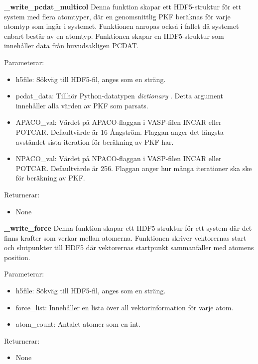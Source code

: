 \documentclass[10pt,oneside,swedish]{article}
\providecommand{\tightlist}{%
  \setlength{\itemsep}{0pt}\setlength{\parskip}{0pt}}
\begin{document}
\textbf{\_write\_pcdat\_multicol} Denna funktion skapar ett
HDF5-struktur för ett system med flera atomtyper, där en genomsnittlig
PKF beräknas för varje atomtyp som ingår i systemet. Funktionen anropas
också i fallet då systemet enbart består av en atomtyp. Funktionen
skapar en HDF5-struktur som innehåller data från huvudsakligen PCDAT.

Parameterar:

\begin{itemize}
\tightlist
\item
  h5file: Sökväg till HDF5-fil, anges som en sträng.
\item
  pcdat\_data: Tillhör Python-datatypen \emph{dictionary} \cite{dict}.
  Detta argument innehåller alla värden av PKF som parsats.
\item
  APACO\_val: Värdet på APACO-flaggan i VASP-filen INCAR eller POTCAR.
  Defaultvärde är 16 Ångström. Flaggan anger det längsta avståndet sista
  iteration för beräkning av PKF har.
\item
  NPACO\_val: Värdet på NPACO-flaggan i VASP-filen INCAR eller POTCAR.
  Defaultvärde är 256. Flaggan anger hur många iterationer ska ske för
  beräkning av PKF.
\end{itemize}

Returnerar:

\begin{itemize}
\tightlist
\item
  None
\end{itemize}

\textbf{\_write\_force}
Denna funktion skapar ett HDF5-struktur för ett system där det finns krafter som verkar mellan atomerna. Funktionen skriver vektorernas start och slutpunkter till HDF5 där vektorernas startpunkt sammanfaller med atomens position.

Parameterar:

\begin{itemize}
\tightlist
\item
  h5file: Sökväg till HDF5-fil, anges som en sträng.
\item
  force\_list: Innehåller en lista över all vektorinformation för varje atom.
\item
  atom\_count: Antalet atomer som en int.
\end{itemize}

Returnerar:

\begin{itemize}
\tightlist
\item
  None
\end{itemize}
\end{document}

